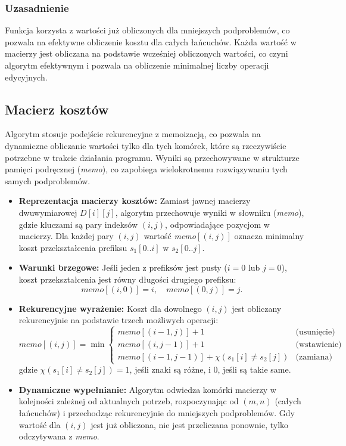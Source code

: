 \subsubsection{Uzasadnienie}
Funkcja korzysta z wartości już obliczonych dla mniejszych podproblemów, co pozwala na efektywne obliczenie kosztu dla całych łańcuchów. Każda wartość w macierzy jest obliczana na podstawie wcześniej obliczonych wartości, co czyni algorytm efektywnym i pozwala na obliczenie minimalnej liczby operacji edycyjnych.

\subsection{Macierz kosztów}
Algorytm stosuje podejście rekurencyjne z memoizacją, co pozwala na dynamiczne obliczanie wartości tylko dla tych komórek, które są rzeczywiście potrzebne w trakcie działania programu. Wyniki są przechowywane w strukturze pamięci podręcznej (\textit{memo}), co zapobiega wielokrotnemu rozwiązywaniu tych samych podproblemów.

\begin{itemize}
    \item \textbf{Reprezentacja macierzy kosztów:} 
    Zamiast jawnej macierzy dwuwymiarowej $D[i][j]$, algorytm przechowuje wyniki w słowniku (\textit{memo}), gdzie kluczami są pary indeksów $(i, j)$, odpowiadające pozycjom w macierzy. Dla każdej pary $(i, j)$ wartość \textit{memo}$[(i, j)]$ oznacza minimalny koszt przekształcenia prefiksu $s_1[0..i]$ w $s_2[0..j]$.

    \item \textbf{Warunki brzegowe:} 
    Jeśli jeden z prefiksów jest pusty ($i = 0$ lub $j = 0$), koszt przekształcenia jest równy długości drugiego prefiksu:
    \[
    \textit{memo}[(i, 0)] = i, \quad \textit{memo}[(0, j)] = j.
    \]

    \item \textbf{Rekurencyjne wyrażenie:} 
    Koszt dla dowolnego $(i, j)$ jest obliczany rekurencyjnie na podstawie trzech możliwych operacji:
    \[
    \textit{memo}[(i, j)] = \min \begin{cases} 
    \textit{memo}[(i-1, j)] + 1 & \text{(usunięcie)} \\
    \textit{memo}[(i, j-1)] + 1 & \text{(wstawienie)} \\
    \textit{memo}[(i-1, j-1)] + \chi(s_1[i] \neq s_2[j]) & \text{(zamiana)} 
    \end{cases}
    \]
    gdzie $\chi(s_1[i] \neq s_2[j]) = 1$, jeśli znaki są różne, i $0$, jeśli są takie same.

    \item \textbf{Dynamiczne wypełnianie:} 
    Algorytm odwiedza komórki macierzy w kolejności zależnej od aktualnych potrzeb, rozpoczynając od $(m, n)$ (całych łańcuchów) i przechodząc rekurencyjnie do mniejszych podproblemów. Gdy wartość dla $(i, j)$ jest już obliczona, nie jest przeliczana ponownie, tylko odczytywana z \textit{memo}.
\end{itemize}

